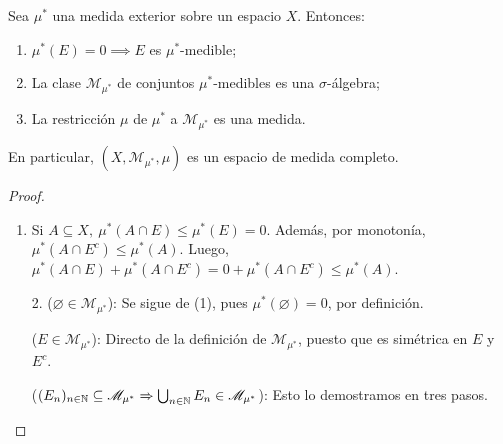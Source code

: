 \begin{theorem}
	Sea $\mu^{*}$ una medida exterior sobre un espacio $X$. Entonces:
	\begin{enumerate}
		\item $\mu^{*}(E) = 0 \implies E$ es $\mu^{*}$-medible;

		\item La clase $\mathscr{M}_{\mu^{*}}$ de conjuntos $\mu^{*}$-medibles es una $\sigma$-álgebra;

		\item La restricción $\mu$ de $\mu^{*}$ a $\mathscr{M}_{\mu^{*}}$ es una medida.
	\end{enumerate}
	En particular, $(X,\mathscr{M}_{\mu^{*}},\mu)$ es un espacio de medida completo.
\end{theorem}
\begin{proof}~
	\begin{enumerate}
		\item Si $A \subseteq X,\ \mu^{*}(A \cap E) \leq \mu^{*}(E) = 0$. Además, por monotonía, $\mu^{*}(A \cap E^c) \leq \mu^{*}(A)$. Luego, $\mu^{*}(A \cap E) + \mu^{*}(A \cap E^c) = 0 + \mu^{*}(A \cap E^c) \leq \mu^{*}(A)$.
	\end{enumerate}
	\hr
	\begin{enumerate}
		\item[2.] ($\varnothing \in \mathscr{M}_{\mu^{*}}$): Se sigue de (1), pues $\mu^{*}(\varnothing) = 0$, por definición.\par
		\smallskip
		($E \in \mathscr{M}_{\mu^{*}}$): Directo de la definición de $\mathscr{M}_{\mu^{*}}$, puesto que es simétrica en $E$ y $E^c$. \par
		\smallskip
		($(E_n)_{n\in\mathbb{N}} \subseteq \mathscr{M}_{\mu^{*}} \Rightarrow \bigcup_{n\in\mathbb{N}} E_n \in \mathscr{M}_{\mu^{*}}$): Esto lo demostramos en tres pasos.


\end{enumerate}
\end{proof}
